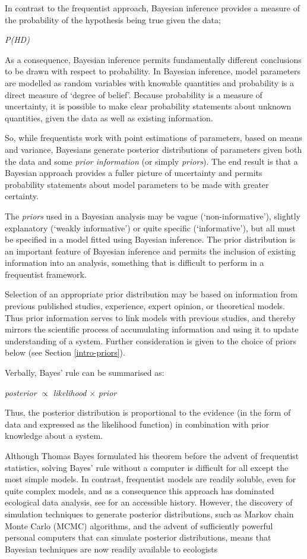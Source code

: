 \documentclass[
]{book}
\begin{document}
In contrast to the frequentist approach, Bayesian inference provides a measure of the probability of the hypothesis being true given the data;

\emph{P(H\textbar D)}

As a consequence, Bayesian inference permits fundamentally different conclusions to be drawn with respect to probability. In Bayesian inference, model parameters are modelled as random variables with knowable quantities and probability is a direct measure of `degree of belief'. Because probability is a measure of uncertainty, it is possible to make clear probability statements about unknown quantities, given the data as well as existing information.

So, while frequentists work with point estimations of parameters, based on means and variance, Bayesians generate posterior distributions of parameters given both the data and some \emph{prior information} (or simply \emph{priors}). The end result is that a Bayesian approach provides a fuller picture of uncertainty and permits probability statements about model parameters to be made with greater certainty.

The \emph{priors} used in a Bayesian analysis may be vague (`non-informative'), slightly explanatory (`weakly informative') or quite specific (`informative'), but all must be specified in a model fitted using Bayesian inference. The prior distribution is an important feature of Bayesian inference and permits the inclusion of existing information into an analysis, something that is difficult to perform in a frequentist framework.

Selection of an appropriate prior distribution may be based on information from previous published studies, experience, expert opinion, or theoretical models. Thus prior information serves to link models with previous studies, and thereby mirrors the scientific process of accumulating information and using it to update understanding of a system. Further consideration is given to the choice of priors below (see Section \ref{intro-priors}).

Verbally, Bayes' rule can be summarised as:

\emph{posterior} \(\propto\) \emph{likelihood} \(\times\) \emph{prior}

Thus, the posterior distribution is proportional to the evidence (in the form of data and expressed as the likelihood function) in combination with prior knowledge about a system.

Although Thomas Bayes formulated his theorem before the advent of frequentist statistics, solving Bayes' rule without a computer is difficult for all except the most simple models. In contrast, frequentist models are readily soluble, even for quite complex models, and as a consequence this approach has dominated ecological data analysis, see \citet{McGrayne_2011} for an accessible history. However, the discovery of simulation techniques to generate posterior distributions, such as Markov chain Monte Carlo (MCMC) algorithms, and the advent of sufficiently powerful personal computers that can simulate posterior distributions, means that Bayesian techniques are now readily available to ecologists
\end{document}
